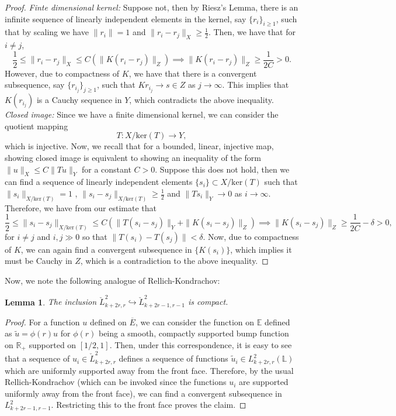 \documentclass[10pt, a4paper]{article}
\theoremstyle{plain}%
\newtheorem{lem}[theorem]{Lemma}
\theoremstyle{definition}
\numberwithin{figure}{section}
\numberwithin{equation}{section}
\newcommand{\bL}{\mathbb{L}}
\newcommand{\bR}{\mathbb{R}}
\newcommand{\bE}{\mathbb{E}}
\newcommand{\tu}{\tilde{u}}
\newcommand{\oE}{{\overline{E}}}
\newcommand{\chL}{\check{L}}
\begin{document}
\begin{proof}
	\textit{Finte dimensional kernel:} Suppose not, then by Riesz's Lemma, there is an infinite sequence of linearly independent elements in the kernel, say $\{r_i\}_{i\geq 1}$, such that by scaling we have $\|r_i\|=1$ and $\|r_i-r_j\|_X\geq \frac{1}{2}$. Then, we have that for $i\neq j$,\[
	\frac{1}{2}\leq \|r_i - r_j\|_X\leq C(\|K(r_i - r_j)\|_Z ) \implies \|K(r_i - r_j)\|_Z \geq \frac{1}{2C} >0 .
	\]
	However, due to compactness of $K$, we have that there is a convergent subsequence, say $\{r_{i_j}\}_{j\geq 1}$, such that $Kr_{i_j} \rightarrow s \in Z$ as $j\rightarrow \infty$. This implies that $K(r_{i_j})$ is a Cauchy sequence in $Y$, which contradicts the above inequality.\\
	
	\textit{Closed image:} Since we have a finite dimensional kernel, we can consider the quotient mapping\[
	T : X/\textrm{ker}(T) \rightarrow Y,
	\]
	which is injective. Now, we recall that for a bounded, linear, injective map, showing closed image is equivalent to showing an inequality of the form $\|u\|_X\leq C\|Tu\|_Y$ for a constant $C>0$. Suppose this does not hold, then we can find a sequence of linearly independent elements $\{s_i\}\subset X/\textrm{ker}(T)$ such that $\|s_i\|_{X/\textrm{ker}(T)} =1$ , $\|s_i-s_j\|_{X/\textrm{ker}(T)}\geq \frac{1}{2}$ and $\|Ts_i\|_Y\rightarrow 0$ as $i\rightarrow \infty$. Therefore, we have from our estimate that \[
	\frac{1}{2} \leq \|s_i -s_j\|_{X/\textrm{ker}(T)} \leq C(\|T(s_i-s_j)\|_Y+\|K(s_i - s_j)\|_Z) \implies \|K(s_i - s_j)\|_Z \geq \frac{1}{2C}-\delta>0,
	\] 
	for $i\neq j$ and $i,j \gg 0$ so that $\|T(s_i) - T(s_j)\|<\delta$. Now, due to compactness of $K$, we can again find a convergent subsequence in $\{K(s_i)\}$, which implies it must be Cauchy in $Z$, which is a contradiction to the above inequality.
\end{proof}


Now, we note the following analogue of Rellich-Kondrachov:

\begin{lem}\label{lem_rellichkondrachovE}
	The inclusion $\chL^2_{k+2r,r} \hookrightarrow \chL^2_{k+2r-1,r-1}$ is compact.
\end{lem}
\begin{proof}
	For a function $u$ defined on $\oE$, we can consider the function on $\bE$ defined as $\tu = \phi(r)u$ for $\phi(r)$ being a smooth, compactly supported bump function on $\bR_+$ supported on $[1/2,1]$. Then, under this correspondence, it is easy to see that a sequence of $u_i\in \chL^2_{k+2r,r}$ defines a sequence of functions $\tu_i \in L^2_{k+2r,r}(\bL)$ which are uniformly supported away from the front face. Therefore, by the usual Rellich-Kondrachov (which can be invoked since the functions $u_i$ are supported uniformly away from the front face), we can find a convergent subsequence in $L^2_{k+2r-1,r-1}$. Restricting this to the front face proves the claim.
\end{proof}
\end{document}
